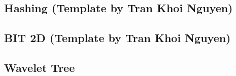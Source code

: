 \subsection{Hashing (Template by Tran Khoi Nguyen)}
\raggedbottom
\hrulefill
\subsection{BIT 2D (Template by Tran Khoi Nguyen)}
\raggedbottom
\hrulefill
\subsection{Wavelet Tree}
\raggedbottom
\hrulefill

